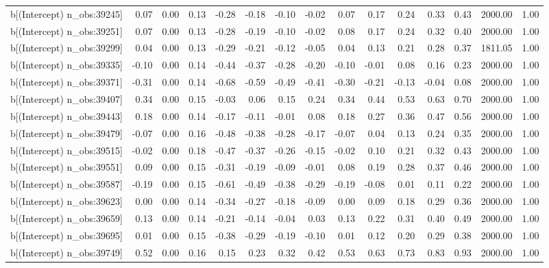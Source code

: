 \begin{table}[ht]
\begin{tabular}{rrrrrrrrrrrrrrr}
  b[(Intercept) n\_obs:39245] & 0.07 & 0.00 & 0.13 & -0.28 & -0.18 & -0.10 & -0.02 & 0.07 & 0.17 & 0.24 & 0.33 & 0.43 & 2000.00 & 1.00 \\ 
  b[(Intercept) n\_obs:39251] & 0.07 & 0.00 & 0.13 & -0.28 & -0.19 & -0.10 & -0.02 & 0.08 & 0.17 & 0.24 & 0.32 & 0.40 & 2000.00 & 1.00 \\ 
  b[(Intercept) n\_obs:39299] & 0.04 & 0.00 & 0.13 & -0.29 & -0.21 & -0.12 & -0.05 & 0.04 & 0.13 & 0.21 & 0.28 & 0.37 & 1811.05 & 1.00 \\ 
  b[(Intercept) n\_obs:39335] & -0.10 & 0.00 & 0.14 & -0.44 & -0.37 & -0.28 & -0.20 & -0.10 & -0.01 & 0.08 & 0.16 & 0.23 & 2000.00 & 1.00 \\ 
  b[(Intercept) n\_obs:39371] & -0.31 & 0.00 & 0.14 & -0.68 & -0.59 & -0.49 & -0.41 & -0.30 & -0.21 & -0.13 & -0.04 & 0.08 & 2000.00 & 1.00 \\ 
  b[(Intercept) n\_obs:39407] & 0.34 & 0.00 & 0.15 & -0.03 & 0.06 & 0.15 & 0.24 & 0.34 & 0.44 & 0.53 & 0.63 & 0.70 & 2000.00 & 1.00 \\ 
  b[(Intercept) n\_obs:39443] & 0.18 & 0.00 & 0.14 & -0.17 & -0.11 & -0.01 & 0.08 & 0.18 & 0.27 & 0.36 & 0.47 & 0.56 & 2000.00 & 1.00 \\ 
  b[(Intercept) n\_obs:39479] & -0.07 & 0.00 & 0.16 & -0.48 & -0.38 & -0.28 & -0.17 & -0.07 & 0.04 & 0.13 & 0.24 & 0.35 & 2000.00 & 1.00 \\ 
  b[(Intercept) n\_obs:39515] & -0.02 & 0.00 & 0.18 & -0.47 & -0.37 & -0.26 & -0.15 & -0.02 & 0.10 & 0.21 & 0.32 & 0.43 & 2000.00 & 1.00 \\ 
  b[(Intercept) n\_obs:39551] & 0.09 & 0.00 & 0.15 & -0.31 & -0.19 & -0.09 & -0.01 & 0.08 & 0.19 & 0.28 & 0.37 & 0.46 & 2000.00 & 1.00 \\ 
  b[(Intercept) n\_obs:39587] & -0.19 & 0.00 & 0.15 & -0.61 & -0.49 & -0.38 & -0.29 & -0.19 & -0.08 & 0.01 & 0.11 & 0.22 & 2000.00 & 1.00 \\ 
  b[(Intercept) n\_obs:39623] & 0.00 & 0.00 & 0.14 & -0.34 & -0.27 & -0.18 & -0.09 & 0.00 & 0.09 & 0.18 & 0.29 & 0.36 & 2000.00 & 1.00 \\ 
  b[(Intercept) n\_obs:39659] & 0.13 & 0.00 & 0.14 & -0.21 & -0.14 & -0.04 & 0.03 & 0.13 & 0.22 & 0.31 & 0.40 & 0.49 & 2000.00 & 1.00 \\ 
  b[(Intercept) n\_obs:39695] & 0.01 & 0.00 & 0.15 & -0.38 & -0.29 & -0.19 & -0.10 & 0.01 & 0.12 & 0.20 & 0.29 & 0.38 & 2000.00 & 1.00 \\ 
  b[(Intercept) n\_obs:39749] & 0.52 & 0.00 & 0.16 & 0.15 & 0.23 & 0.32 & 0.42 & 0.53 & 0.63 & 0.73 & 0.83 & 0.93 & 2000.00 & 1.00 \\ 

\end{tabular}
\end{table}
